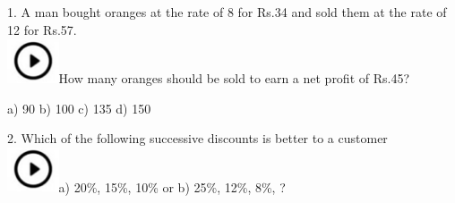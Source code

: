 \documentclass{article}
\begin{document}
	\noindent 
	
	\noindent 
	
	\noindent 
	
	\noindent 
	
	\noindent 
	
	\noindent 
	
	\noindent 
	
	\noindent 
	
	\noindent 
	
	\noindent 
	
	\noindent 
	
	\noindent 
	
	\noindent 
	
	\noindent 
	
	\noindent 
	
	\noindent 
	
	\noindent 
	
	\noindent 
	
	\noindent 
	
	\noindent 
	
	
	\noindent 
	
	\noindent 
	
	\noindent 
	
	1.   A man bought oranges at the rate of 8 for Rs.34 and sold them at the rate of 12 for Rs.57. \noindent \\ \includegraphics*[width=0.60in, height=0.52in]{images/image1}How  many oranges should be sold to earn a net profit of Rs.45?
	
	\noindent 
	
	\noindent a) 90                        b) 100               c) 135                d) 150
	
	\noindent 
	
	2.   Which of the following successive discounts is better to a customer \noindent \\ \includegraphics*[width=0.60in, height=0.52in]{images/image1}a) 20\%, 15\%, 10\% or          b) 25\%, 12\%, 8\%, ?
	
\end{document}
